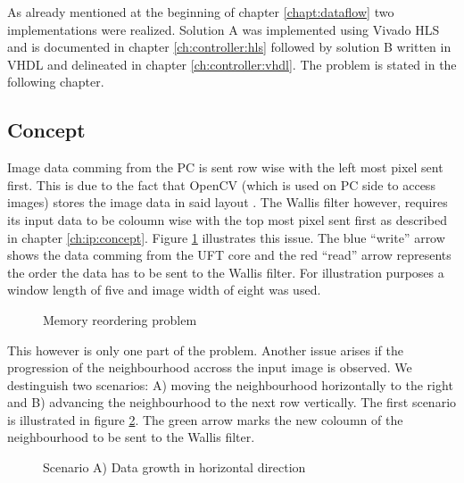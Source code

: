 As already mentioned at the beginning of chapter \ref{chapt:dataflow} two
implementations were realized. Solution A was implemented using Vivado HLS and
is documented in chapter \ref{ch:controller:hls} followed by solution B written
in VHDL and delineated in chapter \ref{ch:controller:vhdl}. The problem is
stated in the following chapter.

\subsection{Concept} \label{ch:control:concept}
Image data comming from the PC is sent row wise with the left most pixel sent
first. This is due to the fact that OpenCV (which is used on PC side to access
images) stores the image data in said layout \cite{opencv_structures}. The
Wallis filter however, requires its input data to be coloumn wise with the top
most pixel sent first as described in chapter \ref{ch:ip:concept}. Figure 
\ref{fig:memproblem} illustrates this issue. The blue ``write'' arrow shows the data
comming from the UFT core and the red ``read'' arrow represents the order the
data has to be sent to the Wallis filter. For illustration purposes a window
length of five and image width of eight was used.

\begin{figure}[H]
    \centering
    \begin{adjustbox}{scale=0.7}
        
    \end{adjustbox}
    \caption{Memory reordering problem}
    \label{fig:memproblem}
\end{figure}

This however is only one part of the problem. Another issue arises if the
progression of the neighbourhood accross the input image is observed. We
destinguish two scenarios: A) moving the neighbourhood horizontally to the right
and B) advancing the neighbourhood to the next row vertically. The first
scenario is illustrated in figure \ref{fig:memproblemgrowthx}. The green arrow
marks the new coloumn of the neighbourhood to be sent to the Wallis filter.

\begin{figure}[H]
    \centering
    \begin{adjustbox}{scale=0.7}
        
    \end{adjustbox}
    \caption{Scenario A) Data growth in horizontal direction}
    \label{fig:memproblemgrowthx}
\end{figure}

